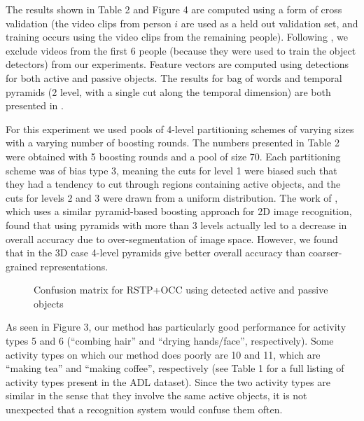 \documentclass{bmvc2k}
\begin{document}
	The results shown in Table 2 and Figure 4 are computed using a form of cross
	validation (the video clips from person $i$ are used as a held out validation set, and
	training occurs using the video clips from the remaining people).
  Following \cite{Ramanan12}, we exclude videos from the first 6 people
  (because they were used to train the object detectors) from our
  experiments.
  Feature vectors are computed using detections for both active and passive
  objects. The results for bag of words and temporal pyramids (2 level, with
  a single cut along the temporal dimension) are both presented in
  \cite{Ramanan12}.
  
  For this experiment we used pools of 4-level partitioning schemes of
  varying sizes with a varying number of boosting rounds. The numbers
  presented in Table 2 were obtained with 5 boosting rounds and a pool of
  size 70.
  Each partitioning scheme was of bias type 3, meaning the cuts for level 1
  were biased such that they had a tendency to cut through regions containing
  active objects, and the cuts for levels 2 and 3 were drawn from a uniform
  distribution. The work of \cite{Jiang12}, which uses a similar
  pyramid-based boosting approach for 2D image recognition, found that using
  pyramids with more than 3 levels actually led to a decrease in overall
  accuracy due to over-segmentation of image space. However, we found that in the
  3D case 4-level pyramids give better overall accuracy than coarser-grained
  representations.
	
  \begin{figure}
  \begin{center}
		   \caption{Confusion matrix for RSTP+OCC using detected active and
       passive objects}
  \label{fig:teaser}
  \end{center}
  \end{figure}
	As seen in Figure 3, our method has particularly good
  performance for activity types 5 and 6 (``combing hair'' and ``drying
  hands/face'', respectively). Some activity types on which our method does
  poorly are 10 and 11, which are ``making tea'' and ``making coffee'',
  respectively (see Table 1 for a full listing of activity types present in
  the ADL dataset). Since the two activity types are similar in the sense that
  they involve the same active objects, it is not
  unexpected that a recognition system would confuse them often.
  
\end{document}
